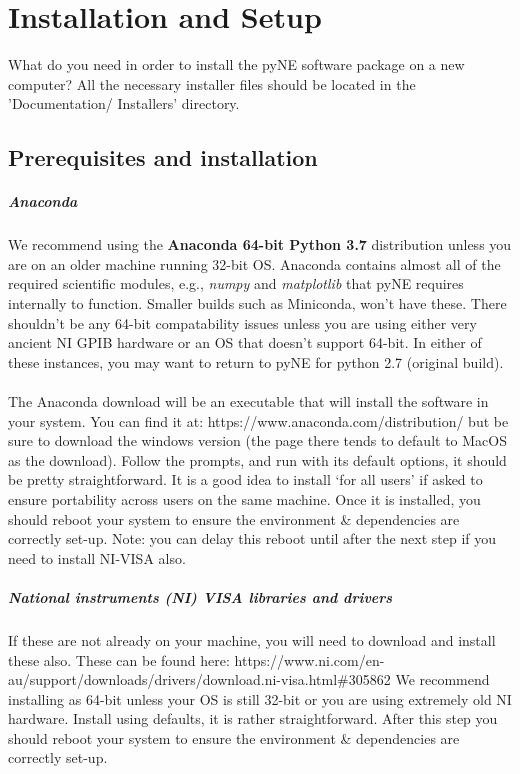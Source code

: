 \chapter{Installation and Setup}
What do you need in order to install the pyNE software package on a new computer? All the necessary installer files should be located in the 'Documentation/ Installers' directory.
\section{Prerequisites and installation}
\paragraph*{Anaconda}
We recommend using the \textbf{Anaconda 64-bit Python 3.7} distribution unless you are on an older machine running 32-bit OS. Anaconda contains almost all of the required scientific modules, e.g., \textit{numpy} and \textit{matplotlib} that pyNE requires internally to function. Smaller builds such as Miniconda, won't have these. There shouldn't be any 64-bit compatability issues unless you are using either very ancient NI GPIB hardware or an OS that doesn't support 64-bit. In either of these instances, you may want to return to pyNE for python 2.7 (original build).\\
\\
The Anaconda download will be an executable that will install the software in your system. You can find it at: https://www.anaconda.com/distribution/ but be sure to download the windows version (the page there tends to default to MacOS as the download). Follow the prompts, and run with its default options, it should be pretty straightforward. It is a good idea to install `for all users' if asked to ensure portability across users on the same machine. Once it is installed, you should reboot your system to ensure the environment \& dependencies are correctly set-up. Note: you can delay this reboot until after the next step if you need to install NI-VISA also.\\

\paragraph*{National instruments (NI) VISA libraries and drivers}
If these are not already on your machine, you will need to download and install these also. These can be found here: https://www.ni.com/en-au/support/downloads/drivers/download.ni-visa.html\#305862 We recommend installing as 64-bit unless your OS is still 32-bit or you are using extremely old NI hardware. Install using defaults, it is rather straightforward. After this step you should reboot your system to ensure the environment \& dependencies are correctly set-up.\\

